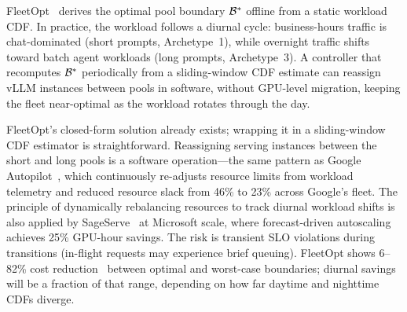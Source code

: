 \begin{opportunity}
\label{opp:dynamic-boundary}
FleetOpt~\cite{fleetopt2026} derives the optimal pool boundary
$\mathcal{B}^*$ offline from a static workload CDF.  In practice,
the workload follows a diurnal cycle: business-hours traffic is
chat-dominated (short prompts, Archetype~1), while overnight
traffic shifts toward batch agent workloads (long prompts,
Archetype~3).  A controller that recomputes $\mathcal{B}^*$
periodically from a sliding-window CDF estimate can reassign vLLM
instances between pools in software, without GPU-level migration,
keeping the fleet near-optimal as the workload rotates through the
day.

\begin{frisk}
FleetOpt's closed-form solution already exists; wrapping it in a
sliding-window CDF estimator is straightforward.  Reassigning
serving instances between the short and long pools is a software
operation---the same pattern as Google
Autopilot~\cite{rzadca2020autopilot}, which continuously
re-adjusts resource limits from workload telemetry and reduced
resource slack from 46\% to 23\% across Google's fleet.  The
principle of dynamically rebalancing resources to track diurnal
workload shifts is also applied by
SageServe~\cite{jia2025sageserve} at Microsoft scale, where
forecast-driven autoscaling achieves 25\% GPU-hour savings.  The
risk is transient SLO violations during transitions (in-flight
requests may experience brief queuing).  FleetOpt shows
6--82\% cost reduction~\cite{fleetopt2026} between optimal and
worst-case boundaries; diurnal savings will be a fraction of that
range, depending on how far daytime and nighttime CDFs diverge.
\end{frisk}
\end{opportunity}

